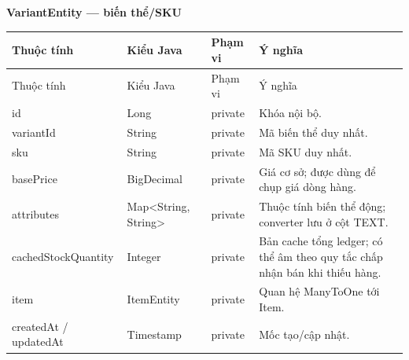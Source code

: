 \documentclass[12pt,a4paper,oneside]{report}
\newcommand{\ClassTableTitle}[1]{\par\medskip\noindent\textbf{#1}\par\smallskip}
\begin{document}
\ClassTableTitle{VariantEntity — biến thể/SKU}
\small\begin{longtable}{@{}D{3.25cm}D{3.35cm}D{1.35cm}D{6.75cm}@{}}\toprule Thuộc tính & Kiểu Java & Phạm vi & Ý nghĩa\\\midrule\endfirsthead\toprule Thuộc tính & Kiểu Java & Phạm vi & Ý nghĩa\\\midrule\endhead\bottomrule\endfoot
id & Long & private & Khóa nội bộ.\\variantId & String & private & Mã biến thể duy nhất.\\sku & String & private & Mã SKU duy nhất.\\basePrice & BigDecimal & private & Giá cơ sở; được dùng để chụp giá dòng hàng.\\attributes & Map\textless String, String\textgreater & private & Thuộc tính biến thể động; converter lưu ở cột TEXT.\\cachedStockQuantity & Integer & private & Bản cache tổng ledger; có thể âm theo quy tắc chấp nhận bán khi thiếu hàng.\\item & ItemEntity & private & Quan hệ ManyToOne tới Item.\allowbreak \\createdAt / updatedAt & Timestamp & private & Mốc tạo/cập nhật.\\\end{longtable}\normalsize
\end{document}
